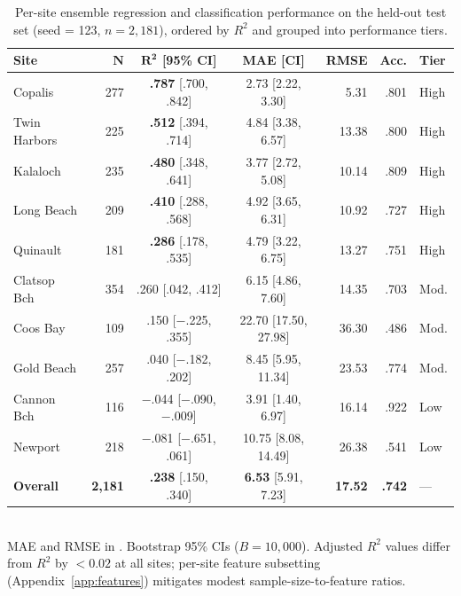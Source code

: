 \documentclass[toxins,article,submit,moreauthors]{Definitions/mdpi}
\begin{document}
\begin{table}[H]
\caption{Per-site ensemble regression and classification performance on the held-out test set (seed = 123, $n = 2{,}181$), ordered by $R^2$ and grouped into performance tiers.}
\label{tab:per-site-results}
\centering\scriptsize
\begin{tabular*}{\linewidth}{@{\extracolsep{\fill}}lrccrrl}
\toprule
\textbf{Site} & $\boldsymbol{N}$ & $\boldsymbol{R^2}$ \textbf{[95\% CI]} & \textbf{MAE [CI]} & \textbf{RMSE} & \textbf{Acc.} & \textbf{Tier} \\
\midrule
Copalis       & 277 & \textbf{.787} [.700, .842] & 2.73 [2.22, 3.30] & 5.31  & .801 & High \\
Twin Harbors  & 225 & \textbf{.512} [.394, .714] & 4.84 [3.38, 6.57] & 13.38 & .800 & High \\
Kalaloch      & 235 & \textbf{.480} [.348, .641] & 3.77 [2.72, 5.08] & 10.14 & .809 & High \\
Long Beach    & 209 & \textbf{.410} [.288, .568] & 4.92 [3.65, 6.31] & 10.92 & .727 & High \\
Quinault      & 181 & \textbf{.286} [.178, .535] & 4.79 [3.22, 6.75] & 13.27 & .751 & High \\
\addlinespace
Clatsop Bch   & 354 & .260 [.042, .412] & 6.15 [4.86, 7.60] & 14.35 & .703 & Mod. \\
Coos Bay      & 109 & .150 [$-$.225, .355] & 22.70 [17.50, 27.98] & 36.30 & .486 & Mod. \\
Gold Beach    & 257 & .040 [$-$.182, .202] & 8.45 [5.95, 11.34] & 23.53 & .774 & Mod. \\
\addlinespace
Cannon Bch    & 116 & $-$.044 [$-$.090, $-$.009] & 3.91 [1.40, 6.97] & 16.14 & .922 & Low \\
Newport       & 218 & $-$.081 [$-$.651, .061] & 10.75 [8.08, 14.49] & 26.38 & .541 & Low \\
\midrule
\textbf{Overall} & \textbf{2,181} & \textbf{.238} [.150, .340] & \textbf{6.53} [5.91, 7.23] & \textbf{17.52} & \textbf{.742} & --- \\
\bottomrule
\end{tabular*}
\vspace{0.3em}\\
\footnotesize{MAE and RMSE in \si{\microgrampeg}. Bootstrap 95\% CIs ($B = 10{,}000$). Adjusted $R^2$ values differ from $R^2$ by $< 0.02$ at all sites; per-site feature subsetting (Appendix~\ref{app:features}) mitigates modest sample-size-to-feature ratios.}
\end{table}
\end{document}
